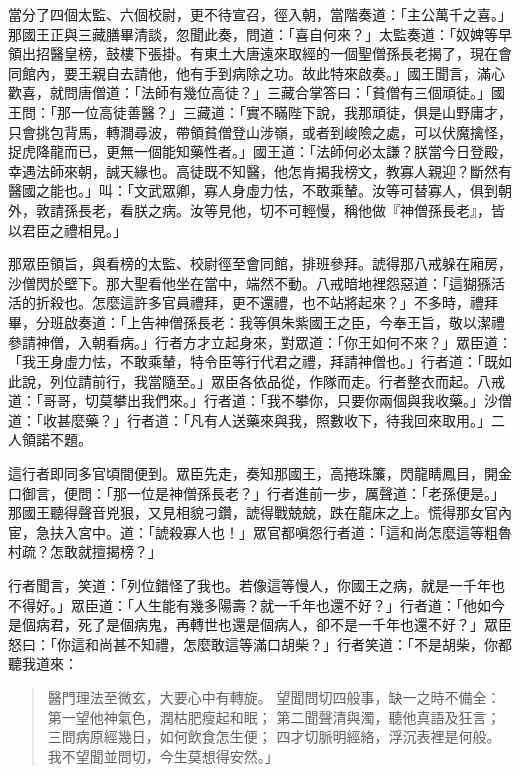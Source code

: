 當分了四個太監、六個校尉，更不待宣召，徑入朝，當階奏道：「主公萬千之喜。」那國王正與三藏膳畢清談，忽聞此奏，問道：「喜自何來？」太監奏道：「奴婢等早領出招醫皇榜，鼓樓下張掛。有東土大唐遠來取經的一個聖僧孫長老揭了，現在會同館內，要王親自去請他，他有手到病除之功。故此特來啟奏。」國王聞言，滿心歡喜，就問唐僧道：「法師有幾位高徒？」三藏合掌答曰：「貧僧有三個頑徒。」國王問：「那一位高徒善醫？」三藏道：「實不瞞陛下說，我那頑徒，俱是山野庸才，只會挑包背馬，轉澗尋波，帶領貧僧登山涉嶺，或者到峻險之處，可以伏魔擒怪，捉虎降龍而已，更無一個能知藥性者。」國王道：「法師何必太謙？朕當今日登殿，幸遇法師來朝，誠天緣也。高徒既不知醫，他怎肯揭我榜文，教寡人親迎？斷然有醫國之能也。」叫：「文武眾卿，寡人身虛力怯，不敢乘輦。汝等可替寡人，俱到朝外，敦請孫長老，看朕之病。汝等見他，切不可輕慢，稱他做『神僧孫長老』，皆以君臣之禮相見。」

那眾臣領旨，與看榜的太監、校尉徑至會同館，排班參拜。諕得那八戒躲在廂房，沙僧閃於壁下。那大聖看他坐在當中，端然不動。八戒暗地裡怨惡道：「這猢猻活活的折殺也。怎麼這許多官員禮拜，更不還禮，也不站將起來？」不多時，禮拜畢，分班啟奏道：「上告神僧孫長老：我等俱朱紫國王之臣，今奉王旨，敬以潔禮參請神僧，入朝看病。」行者方才立起身來，對眾道：「你王如何不來？」眾臣道：「我王身虛力怯，不敢乘輦，特令臣等行代君之禮，拜請神僧也。」行者道：「既如此說，列位請前行，我當隨至。」眾臣各依品從，作隊而走。行者整衣而起。八戒道：「哥哥，切莫攀出我們來。」行者道：「我不攀你，只要你兩個與我收藥。」沙僧道：「收甚麼藥？」行者道：「凡有人送藥來與我，照數收下，待我回來取用。」二人領諾不題。

這行者即同多官頃間便到。眾臣先走，奏知那國王，高捲珠簾，閃龍睛鳳目，開金口御言，便問：「那一位是神僧孫長老？」行者進前一步，厲聲道：「老孫便是。」那國王聽得聲音兇狠，又見相貌刁鑽，諕得戰兢兢，跌在龍床之上。慌得那女官內宦，急扶入宮中。道：「諕殺寡人也！」眾官都嗔怨行者道：「這和尚怎麼這等粗魯村疏？怎敢就擅揭榜？」

行者聞言，笑道：「列位錯怪了我也。若像這等慢人，你國王之病，就是一千年也不得好。」眾臣道：「人生能有幾多陽壽？就一千年也還不好？」行者道：「他如今是個病君，死了是個病鬼，再轉世也還是個病人，卻不是一千年也還不好？」眾臣怒曰：「你這和尚甚不知禮，怎麼敢這等滿口胡柴？」行者笑道：「不是胡柴，你都聽我道來：
\begin{quote}
醫門理法至微玄，大要心中有轉旋。
望聞問切四般事，缺一之時不備全：
第一望他神氣色，潤枯肥瘦起和眠；
第二聞聲清與濁，聽他真語及狂言；
三問病原經幾日，如何飲食怎生便；
四才切脈明經絡，浮沉表裡是何般。
我不望聞並問切，今生莫想得安然。」
\end{quote}

